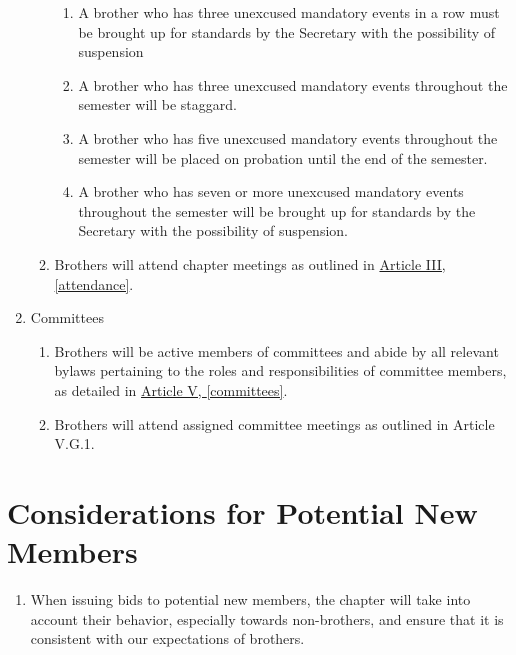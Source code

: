 \begin{enumerate}
\begin{enumerate}
\begin{enumerate}
						\item A brother who has three unexcused mandatory events in a row must be brought up for standards by the Secretary with the possibility of suspension

						\item A brother who has three unexcused mandatory events throughout the semester will be staggard.

						\item A brother who has five unexcused mandatory events throughout the semester will be placed on probation until the end of the semester.

						\item A brother who has seven or more unexcused mandatory events throughout the semester will be brought up for standards by the Secretary with the possibility of suspension.
					\end{enumerate}

				\item Brothers will attend chapter meetings as outlined in \hyperref[attendance]{Article III, \autoref*{attendance}}.
			\end{enumerate}

		\item Committees
			\begin{enumerate}
				\item Brothers will be active members of committees and abide by all relevant bylaws pertaining to the roles and responsibilities of committee members, as detailed in \hyperref[committees]{Article V, \autoref*{committees}}.
				\item Brothers will attend assigned committee meetings as outlined in Article V.G.1.
			\end{enumerate}

	\end{enumerate}
	
\section{Considerations for Potential New Members}
	\begin{enumerate}
		\item When issuing bids to potential new members, the chapter will take into account their behavior, especially towards non-brothers, and ensure that it is consistent with our expectations of brothers.
	\end{enumerate}
